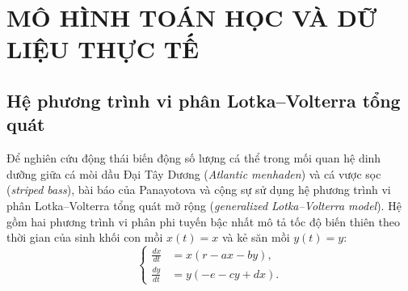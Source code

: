 \chapter{MÔ HÌNH TOÁN HỌC VÀ DỮ LIỆU THỰC TẾ}
\label{ch:model}

\section{Hệ phương trình vi phân Lotka--Volterra tổng quát}
\label{sec:model_lv}

Để nghiên cứu động thái biến động số lượng cá thể trong mối quan hệ dinh dưỡng giữa cá mòi dầu Đại Tây Dương (\textit{Atlantic menhaden}) và cá vược sọc (\textit{striped bass}), bài báo của Panayotova và cộng sự \cite{panayotova2023bioeconomic} sử dụng hệ phương trình vi phân Lotka--Volterra tổng quát mở rộng (\textit{generalized Lotka--Volterra model}). Hệ gồm hai phương trình vi phân phi tuyến bậc nhất mô tả tốc độ biến thiên theo thời gian của sinh khối con mồi $x(t) = x$ và kẻ săn mồi $y(t) = y$:
\begin{equation}
\label{eq:lv_two_species}
\left\{
\begin{aligned}
\frac{dx}{dt} &= x(r - ax - by), \\
\frac{dy}{dt} &= y(-e - cy + dx).
\end{aligned}
\right.
\end{equation}

